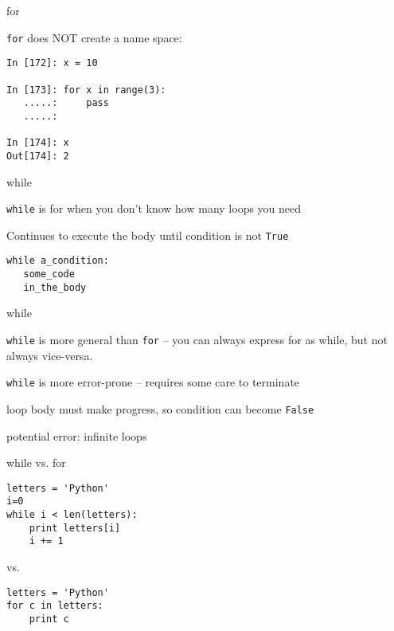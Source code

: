 \documentclass{beamer}
\begin{document}
\begin{frame}[fragile]{for}

{\Large \verb|for| does NOT create a name space:}

\begin{verbatim}
In [172]: x = 10

In [173]: for x in range(3):
   .....:     pass
   .....: 

In [174]: x
Out[174]: 2
\end{verbatim}
\end{frame}



\begin{frame}[fragile]{while}

{\Large \verb|while| is for when you don't know how many loops you need}

\vfill
{\Large Continues to execute the body until condition is not \verb|True|}

\begin{verbatim}
while a_condition:
   some_code
   in_the_body
\end{verbatim}
\end{frame}



\begin{frame}[fragile]{while}

{\Large \verb|while| is more general than \verb|for| -- 
you can always express for as while,
but not always vice-versa.}

\vfill

{\Large \verb|while| is more error-prone -- requires some care to terminate}

\vfill
{\Large  loop body must make progress, so condition can become \verb|False| }

\vfill
{\Large  potential error: infinite loops }
\end{frame}



\begin{frame}[fragile]{while vs. for}

\begin{verbatim}
letters = 'Python'
i=0
while i < len(letters):
    print letters[i]
    i += 1
\end{verbatim}
vs.
\begin{verbatim}
letters = 'Python'
for c in letters:
    print c
\end{verbatim}

\end{frame}
\end{document}

